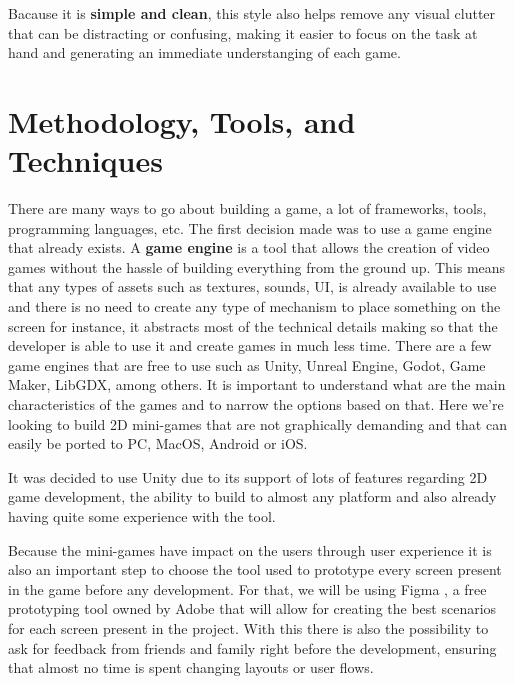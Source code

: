 Bacause it is \textbf{simple and clean}, this style also helps remove any visual clutter that can be distracting or confusing, making it easier to focus on the task at hand and generating an immediate understanging of each game.



\newpage
\section{Methodology, Tools, and Techniques}
There are many ways to go about building a game, a lot of frameworks, tools, programming languages, etc. The first decision made was to use a game engine that already exists. A \textbf{game engine} is a tool that allows the creation of video games without the hassle of building everything from the ground up. This means that any types of assets such as textures, sounds, UI, is already available to use and there is no need to create any type of mechanism to place something on the screen for instance, it abstracts most of the technical details making so that the developer is able to use it and create games in much less time. There are a few game engines that are free to use such as Unity, Unreal Engine, Godot, Game Maker, LibGDX, among others.
It is important to understand what are the main characteristics of the games and to narrow the options based on that.
Here we're looking to build 2D mini-games that are not graphically demanding and that can easily be ported to PC, MacOS, Android or iOS.

It was decided to use Unity due to its support of lots of features regarding 2D game development, the ability to build to almost any platform and also already having quite some experience with the tool.

Because the mini-games have impact on the users through user experience it is also an important step to choose the tool used to prototype every screen present in the game before any development. For that, we will be using Figma \cite{figma}, a free prototyping tool owned by Adobe that will allow for creating the best scenarios for each screen present in the project. With this there is also the possibility to ask for feedback from friends and family right before the development, ensuring that almost no time is spent changing layouts or user flows.

